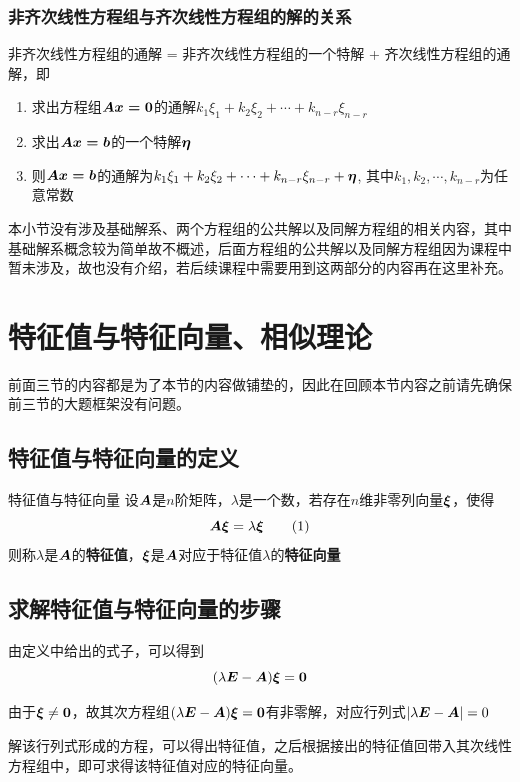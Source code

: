 \documentclass[12pt, a4paper, oneside, UTF8]{ctexbook}
\begin{document}
\subsubsection{非齐次线性方程组与齐次线性方程组的解的关系}
非齐次线性方程组的通解 = 非齐次线性方程组的一个特解 + 齐次线性方程组的通解，即
\begin{enumerate}[leftmargin=4em]
    \item 求出方程组$\boldsymbol{Ax=0}$的通解$k_1\xi_1+k_2\xi_2+\cdots+k_{n-r}\xi_{n-r}$
    \item 求出$\boldsymbol{Ax=b}$的一个特解$\boldsymbol{\eta}$
    \item 则$\boldsymbol{Ax=b}$的通解为$k_1\xi_1+k_2\xi_2+\cdots+k_{n-r}\xi_{n-r}+\boldsymbol{\eta}$, 其中$k_1,k_2,\cdots,k_{n-r}$为任意常数
\end{enumerate}
\begin{rmk}
    本小节没有涉及基础解系、两个方程组的公共解以及同解方程组的相关内容，其中基础解系概念较为简单故不概述，后面方程组的公共解以及同解方程组因为课程中暂未涉及，故也没有介绍，若后续课程中需要用到这两部分的内容再在这里补充。
\end{rmk}
\section{特征值与特征向量、相似理论}
前面三节的内容都是为了本节的内容做铺垫的，因此在回顾本节内容之前请先确保前三节的大题框架没有问题。
\subsection{特征值与特征向量的定义}
\begin{defn}{特征值与特征向量}{}
设$\boldsymbol{A}$是$n$阶矩阵，$\lambda$是一个数，若存在$n$维非零列向量$\boldsymbol{\xi}$，使得\[\boldsymbol{A\xi}=\lambda\boldsymbol{\xi}\tag{1}\]则称$\lambda$是$\boldsymbol{A}$的\textbf{特征值}，$\boldsymbol{\xi}$是$\boldsymbol{A}$对应于特征值$\lambda$的\textbf{特征向量}
\end{defn}

\subsection{求解特征值与特征向量的步骤}
由定义中给出的式子，可以得到\[(\lambda\boldsymbol{E}-\boldsymbol{A})\boldsymbol{\xi}=\boldsymbol{0}\]

由于$\boldsymbol{\xi}\neq\boldsymbol{0}$，故其次方程组$(\lambda\boldsymbol{E}-\boldsymbol{A})\boldsymbol{\xi}=\boldsymbol{0}$有非零解，对应行列式$|\lambda\boldsymbol{E}-\boldsymbol{A}|=0$

解该行列式形成的方程，可以得出特征值，之后根据接出的特征值回带入其次线性方程组中，即可求得该特征值对应的特征向量。
\end{document}
